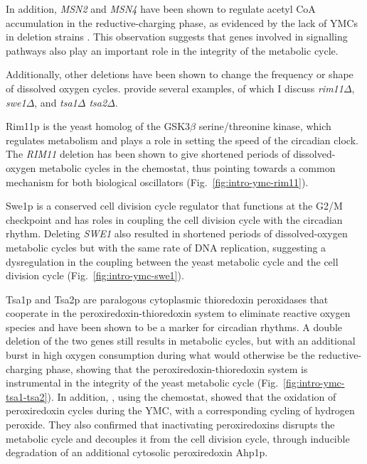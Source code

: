In addition, \textit{MSN2} and \textit{MSN4} have been shown to regulate acetyl CoA accumulation in the reductive-charging phase, as evidenced by the lack of YMCs in deletion strains \parencite{kuangMsn2RegulateExpression2017}.
This observation suggests that genes involved in signalling pathways also play an important role in the integrity of the metabolic cycle.

Additionally, other deletions have been shown to change the frequency or shape of dissolved oxygen cycles.
\textcite{caustonMetabolicCyclesYeast2015} provide several examples, of which I discuss \textit{rim11$\Delta$}, \textit{swe1$\Delta$}, and \textit{tsa1$\Delta$ tsa2$\Delta$}. %

Rim11p is the yeast homolog of the GSK3$\beta$ serine/threonine kinase, which regulates metabolism and plays a role in setting the speed of the circadian clock.
The \textit{RIM11} deletion has been shown to give shortened periods of dissolved-oxygen metabolic cycles in the chemostat, thus pointing towards a common mechanism for both biological oscillators (Fig.\ \ref{fig:intro-ymc-rim11}).

Swe1p is a conserved cell division cycle regulator that functions at the G2/M checkpoint and has roles in coupling the cell division cycle with the circadian rhythm.
Deleting \textit{SWE1} also resulted in shortened periods of dissolved-oxygen metabolic cycles but with the same rate of DNA replication, suggesting a dysregulation in the coupling between the yeast metabolic cycle and the cell division cycle (Fig.\ \ref{fig:intro-ymc-swe1}).

Tsa1p and Tsa2p are paralogous cytoplasmic thioredoxin peroxidases that cooperate in the peroxiredoxin-thioredoxin system to eliminate reactive oxygen species and have been shown to be a marker for circadian rhythms.
A double deletion of the two genes still results in metabolic cycles, but with an additional burst in high oxygen consumption during what would otherwise be the reductive-charging phase, showing that the peroxiredoxin-thioredoxin system is instrumental in the integrity of the yeast metabolic cycle (Fig.\ \ref{fig:intro-ymc-tsa1-tsa2}).
In addition, \textcite{amponsahPeroxiredoxinsCoupleMetabolism2021}, using the chemostat, showed that the oxidation of peroxiredoxin cycles during the YMC, with a corresponding cycling of hydrogen peroxide.
They also confirmed that inactivating peroxiredoxins disrupts the metabolic cycle and decouples it from the cell division cycle, through inducible degradation of an additional cytosolic peroxiredoxin Ahp1p.

